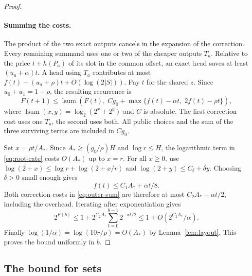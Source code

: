 \begin{proof}
\paragraph{Summing the costs.}
The product of the two exact outputs cancels in the expansion of the
correction. Every remaining summand uses one or two of the cheaper
outputs \(T_a\). Relative to the price \(t+h(P_a)\) of its slot in
the common offset, an exact head saves at least \((u_a+\alpha)t\).
A head using \(T_a\) contributes at most
\(f(t)-(u_a+\rho)t+O(\log(2|S|))\). Pay \(t\) for the shared \(z\).
Since \(u_0+u_1=1-\rho\), the resulting recurrence is
\begin{equation}\label{eq:outer-sum}
 F(t+1)\le
 \operatorname{lsum}\!\left(F(t),\;
 Cg_0+\max\{f(t)-\alpha t,\;2f(t)-\rho t\}\right),
\end{equation}
where \(\operatorname{lsum}(x,y)=\log_2(2^x+2^y)\) and \(C\) is
absolute. The first correction cost uses one \(T_a\), the second
uses both. All public choices and the sum of the three surviving
terms are included in \(Cg_0\).

Set \(x=\rho t/A_*\). Since \(A_*\ge(g_0/\rho)H\) and
\(\log r\le H\), the logarithmic term in \eqref{eq:root-rate} costs
\(O(A_*)\) up to \(x=r\). For all \(x\ge0\), use
\(\log(2+x)\le\log r+\log(2+x/r)\) and
\(\log(2+y)\le C_\delta+\delta y\). Choosing \(\delta>0\) small
enough gives
\[
                     f(t)\le C_1 A_*+\alpha t/8 .
\]
Both correction costs in \eqref{eq:outer-sum} are therefore at most
\(C_2 A_*-\alpha t/2\), including the overhead. Iterating after
exponentiation gives
\[
  2^{F(b)}
     \le 1+2^{C_2 A_*}\sum_{t=0}^{b-1}2^{-\alpha t/2}
     \le 1+O(2^{C_2 A_*}/\alpha).
\]
Finally \(\log(1/\alpha)=\log(10r/\rho)=O(A_*)\) by
Lemma~\ref{lem:layout}. This proves the bound uniformly in \(b\).
\end{proof}

\subsection{The bound for sets}

